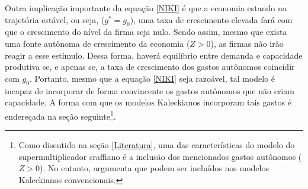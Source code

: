 Outra implicação importante da equação \ref{NIKI} é que a economia estando na trajetória estável, ou seja, ($g^* = g_0$), uma taxa de crescimento elevada fará com que o crescimento do nível da firma seja nulo. Sendo assim, mesmo que exista uma fonte autônoma de crescimento da economia ($Z > 0$), as firmas não irão reagir a esse estímulo.  Dessa forma, haverá equilíbrio entre demanda e capacidade produtiva se, e apenas se, a taxa de crescimento dos gastos autônomos coincidir com $g_0$. Portanto, mesmo que a equação \ref{NIKI} seja razoável, tal modelo é incapaz de incorporar de forma convincente os gastos autônomos que não criam capacidade. A forma com que os modelos Kaleckianos incorporam tais gastos é endereçada na seção seguinte\footnote{Como discutido na seção \ref{Literatura}, uma das características do modelo do supermultiplicador sraffiano é a inclusão dos mencionados gastos autônomos ($Z>0$). No entanto, \textcite{nikiforos_comments_2018} argumenta que podem ser incluídos nos modelos Kaleckianos convencionais.}.